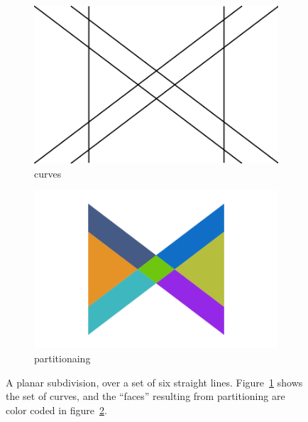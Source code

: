 \begin{figure}%
  \centering
  \begin{subfigure}{.4\textwidth}
    \includegraphics[width=\textwidth]{figures/intro_curves1.png}
    \caption{curves} \label{subfig:intro_curves1}
  \end{subfigure}%
  \quad \quad \quad%
  \begin{subfigure}{.4\textwidth}
    \includegraphics[width=\textwidth]{figures/intro_partitioning1.png}
    \caption{partitionaing} \label{subfig:intro_partitioning1}
  \end{subfigure}%
  \caption[xxx]
          {A planar subdivision, over a set of six straight lines.
          Figure~\ref{subfig:intro_curves1} shows the set of curves, and the ``faces'' resulting from partitioning are color coded in figure~\ref{subfig:intro_partitioning1}.}
  \label{fig:intro_curvesPartitioning1}
\end{figure}

